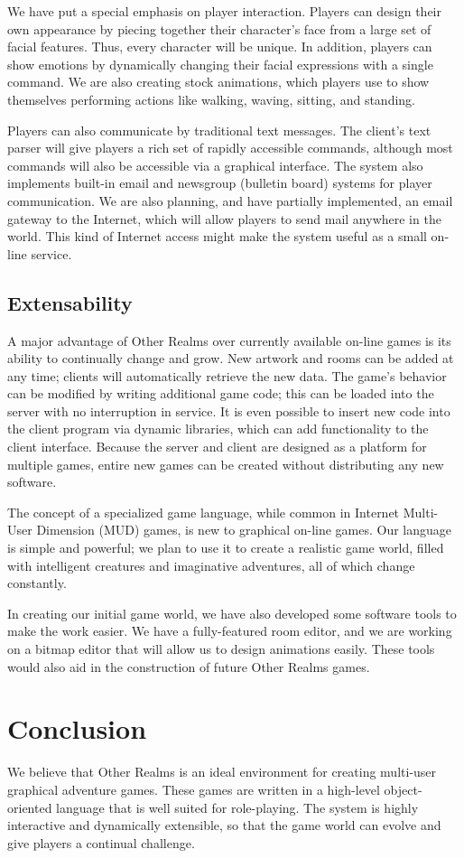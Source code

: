 \documentclass[12pt]{article}
\begin{document}
We have put a special emphasis on player interaction.  Players can
design their own appearance by piecing together their character's face
from a large set of facial features.  Thus, every character will be
unique.  In addition, players can show emotions by dynamically
changing their facial expressions with a single command.  We are also
creating stock animations, which players use to show themselves
performing actions like walking, waving, sitting, and standing.

Players can also communicate by traditional text messages.  The
client's text parser will give players a rich set of rapidly
accessible commands, although most commands will also be accessible
via a graphical interface.  The system also implements built-in email
and newsgroup (bulletin board) systems for player communication.  We
are also planning, and have partially implemented, an email gateway to
the Internet, which will allow players to send mail anywhere in the
world.  This kind of Internet access might make the system useful as a
small on-line service.

\subsection{Extensability}

A major advantage of Other Realms over currently available on-line
games is its ability to continually change and grow.  New artwork and
rooms can be added at any time; clients will automatically retrieve
the new data.  The game's behavior can be modified by writing
additional game code; this can be loaded into the server with no
interruption in service.  It is even possible to insert new code into
the client program via dynamic libraries, which can add functionality
to the client interface.  Because the server and client are designed
as a platform for multiple games, entire new games can be created
without distributing any new software.

The concept of a specialized game language, while common in Internet
Multi-User Dimension (MUD) games, is new to graphical on-line games.
Our language is simple and powerful; we plan to use it to create a
realistic game world, filled with intelligent creatures and
imaginative adventures, all of which change constantly.

In creating our initial game world, we have also developed some
software tools to make the work easier.  We have a fully-featured room
editor, and we are working on a bitmap editor that will allow us to
design animations easily.  These tools would also aid in the
construction of future Other Realms games.

\section{Conclusion}

We believe that Other Realms is an ideal environment for creating
multi-user graphical adventure games.  These games are written in a
high-level object-oriented language that is well suited for
role-playing.  The system is highly interactive and dynamically
extensible, so that the game world can evolve and give players a
continual challenge.
\end{document}
